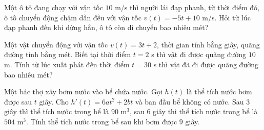 \begin{vd}%
	Một ô tô đang chạy với vận tốc $10$ m/s thì người lái đạp phanh, từ thời điểm đó, ô tô chuyển động chậm dần đều với vận tốc $v(t)=-5t+10$ m/s. Hỏi từ lúc đạp phanh đến khi dừng hẳn, ô tô còn di chuyển bao nhiêu mét?
\end{vd}
\begin{vd}
	Một vật chuyển động với vận tốc $v(t)=3t+2$, thời gian tính bằng giây, quãng đường tính bằng mét. Biết tại thời điểm $t=2$ s thì vật đi được quãng đường $10$ m. Tính từ lúc xuất phát đến thời điểm $t=30$ s thì vật đã đi được quãng đường bao nhiêu mét?
\end{vd}

\begin{vd}
	Một bác thợ xây bơm nước vào bể chứa nước. Gọi $h(t)$ là thể tích nước bơm được sau $t$ giây. Cho $h'(t) = 6at^2 +2bt$ và ban đầu bể không có nước. Sau 3 giây thì thể tích nước trong bể là $90$ m$^3$, sau 6 giây thì thể tích nước trong bể là $504$ m$^3$. Tính thể tích nước trong bể sau khi bơm được $9$ giây.
\end{vd}

